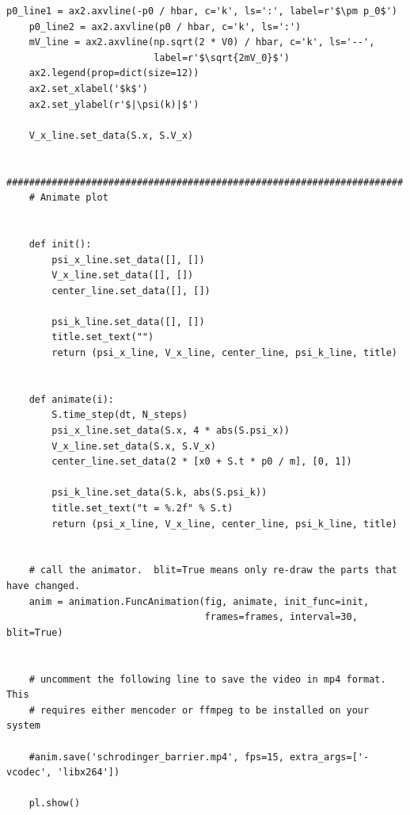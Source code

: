 \documentclass[UTF8,ctexart,a4paper,11pt,openany]{article}
\theoremstyle{definition}
\begin{document}
\begin{lstlisting}[aboveskip=0pt]
    p0_line1 = ax2.axvline(-p0 / hbar, c='k', ls=':', label=r'$\pm p_0$')
    p0_line2 = ax2.axvline(p0 / hbar, c='k', ls=':')
    mV_line = ax2.axvline(np.sqrt(2 * V0) / hbar, c='k', ls='--',
                          label=r'$\sqrt{2mV_0}$')
    ax2.legend(prop=dict(size=12))
    ax2.set_xlabel('$k$')
    ax2.set_ylabel(r'$|\psi(k)|$')
    
    V_x_line.set_data(S.x, S.V_x)
    
    ######################################################################
    # Animate plot
    
    
    def init():
        psi_x_line.set_data([], [])
        V_x_line.set_data([], [])
        center_line.set_data([], [])
    
        psi_k_line.set_data([], [])
        title.set_text("")
        return (psi_x_line, V_x_line, center_line, psi_k_line, title)
    
    
    def animate(i):
        S.time_step(dt, N_steps)
        psi_x_line.set_data(S.x, 4 * abs(S.psi_x))
        V_x_line.set_data(S.x, S.V_x)
        center_line.set_data(2 * [x0 + S.t * p0 / m], [0, 1])
    
        psi_k_line.set_data(S.k, abs(S.psi_k))
        title.set_text("t = %.2f" % S.t)
        return (psi_x_line, V_x_line, center_line, psi_k_line, title)
    
    
    # call the animator.  blit=True means only re-draw the parts that have changed.
    anim = animation.FuncAnimation(fig, animate, init_func=init,
                                   frames=frames, interval=30, blit=True)
    
    
    # uncomment the following line to save the video in mp4 format.  This
    # requires either mencoder or ffmpeg to be installed on your system
    
    #anim.save('schrodinger_barrier.mp4', fps=15, extra_args=['-vcodec', 'libx264'])
    
    pl.show()
\end{lstlisting}

\clearpage




\end{document}
